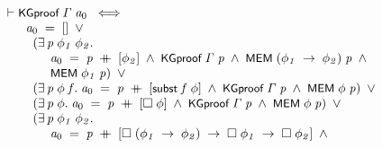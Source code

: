 \documentclass[letterpaper]{article}
\renewcommand{\HOLConst}[1]{{\textsf{\upshape\small #1}}}
\newenvironment{holmath}{\begin{displaymath}\begin{array}{l}}{\end{array}\end{displaymath}\ignorespacesafterend}
\begin{document}
\begin{holmath}
  \ensuremath{\HOLTokenTurnstile}\HOLConst{KGproof}\;\HOLFreeVar{\ensuremath{\Gamma}}\;\HOLFreeVar{a\sb{\mathrm{0}}}\;\HOLSymConst{\HOLTokenEquiv{}}\\
\;\;\;\;\;\;\;\HOLFreeVar{a\sb{\mathrm{0}}}\;\HOLSymConst{=}\;[]\;\HOLSymConst{\HOLTokenDisj{}}\\
\;\;\;\;\;\;\;\;\;(\HOLSymConst{\HOLTokenExists{}}\HOLBoundVar{p}\;\HOLBoundVar{\ensuremath{\phi\sb{1}}}\;\HOLBoundVar{\ensuremath{\phi\sb{2}}}.\\
\;\;\;\;\;\;\;\;\;\;\;\;\;\;\HOLFreeVar{a\sb{\mathrm{0}}}\;\HOLSymConst{=}\;\HOLBoundVar{p}\;\HOLSymConst{\HOLTokenDoublePlus}\;[\HOLBoundVar{\ensuremath{\phi\sb{2}}}]\;\HOLSymConst{\HOLTokenConj{}}\;\HOLConst{KGproof}\;\HOLFreeVar{\ensuremath{\Gamma}}\;\HOLBoundVar{p}\;\HOLSymConst{\HOLTokenConj{}}\;\HOLConst{MEM}\;(\HOLBoundVar{\ensuremath{\phi\sb{1}}}\;\HOLSymConst{\ensuremath{\rightarrow}}\;\HOLBoundVar{\ensuremath{\phi\sb{2}}})\;\HOLBoundVar{p}\;\HOLSymConst{\HOLTokenConj{}}\\
\;\;\;\;\;\;\;\;\;\;\;\;\;\;\HOLConst{MEM}\;\HOLBoundVar{\ensuremath{\phi\sb{1}}}\;\HOLBoundVar{p})\;\HOLSymConst{\HOLTokenDisj{}}\\
\;\;\;\;\;\;\;\;\;(\HOLSymConst{\HOLTokenExists{}}\HOLBoundVar{p}\;\HOLBoundVar{\ensuremath{\phi}}\;\HOLBoundVar{f}.\;\HOLFreeVar{a\sb{\mathrm{0}}}\;\HOLSymConst{=}\;\HOLBoundVar{p}\;\HOLSymConst{\HOLTokenDoublePlus}\;[\HOLConst{subst}\;\HOLBoundVar{f}\;\HOLBoundVar{\ensuremath{\phi}}]\;\HOLSymConst{\HOLTokenConj{}}\;\HOLConst{KGproof}\;\HOLFreeVar{\ensuremath{\Gamma}}\;\HOLBoundVar{p}\;\HOLSymConst{\HOLTokenConj{}}\;\HOLConst{MEM}\;\HOLBoundVar{\ensuremath{\phi}}\;\HOLBoundVar{p})\;\HOLSymConst{\HOLTokenDisj{}}\\
\;\;\;\;\;\;\;\;\;(\HOLSymConst{\HOLTokenExists{}}\HOLBoundVar{p}\;\HOLBoundVar{\ensuremath{\phi}}.\;\HOLFreeVar{a\sb{\mathrm{0}}}\;\HOLSymConst{=}\;\HOLBoundVar{p}\;\HOLSymConst{\HOLTokenDoublePlus}\;[\HOLSymConst{\ensuremath{\Box}}\;\HOLBoundVar{\ensuremath{\phi}}]\;\HOLSymConst{\HOLTokenConj{}}\;\HOLConst{KGproof}\;\HOLFreeVar{\ensuremath{\Gamma}}\;\HOLBoundVar{p}\;\HOLSymConst{\HOLTokenConj{}}\;\HOLConst{MEM}\;\HOLBoundVar{\ensuremath{\phi}}\;\HOLBoundVar{p})\;\HOLSymConst{\HOLTokenDisj{}}\\
\;\;\;\;\;\;\;\;\;(\HOLSymConst{\HOLTokenExists{}}\HOLBoundVar{p}\;\HOLBoundVar{\ensuremath{\phi\sb{1}}}\;\HOLBoundVar{\ensuremath{\phi\sb{2}}}.\\
\;\;\;\;\;\;\;\;\;\;\;\;\;\;\HOLFreeVar{a\sb{\mathrm{0}}}\;\HOLSymConst{=}\;\HOLBoundVar{p}\;\HOLSymConst{\HOLTokenDoublePlus}\;[\HOLSymConst{\ensuremath{\Box}}\;(\HOLBoundVar{\ensuremath{\phi\sb{1}}}\;\HOLSymConst{\ensuremath{\rightarrow}}\;\HOLBoundVar{\ensuremath{\phi\sb{2}}})\;\HOLSymConst{\ensuremath{\rightarrow}}\;\HOLSymConst{\ensuremath{\Box}}\;\HOLBoundVar{\ensuremath{\phi\sb{1}}}\;\HOLSymConst{\ensuremath{\rightarrow}}\;\HOLSymConst{\ensuremath{\Box}}\;\HOLBoundVar{\ensuremath{\phi\sb{2}}}]\;\HOLSymConst{\HOLTokenConj{}}\\

\end{holmath}
\end{document}
